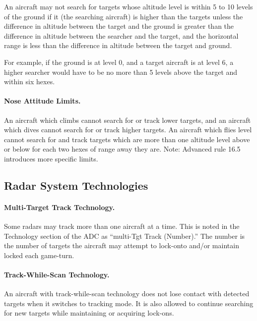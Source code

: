 {An aircraft may not search for targets whose altitude level is within 5 to 10 levels of the ground if it (the searching aircraft) is higher than the targets unless the difference in altitude between the target and the ground is greater than the difference in altitude between the searcher and the target, and the horizontal range is less than the difference in altitude between the target and ground.

For example, if the ground is at level 0, and a target aircraft is at level 6, a higher searcher would have to be no more than 5 levels above the target and within six hexes.


\paragraph{Nose Attitude Limits.} An aircraft which climbs cannot search for or track lower targets, and an aircraft which dives cannot search for or track higher targets. An aircraft which flies level cannot search for and track targets which are more than one altitude level above or below for each two hexes of range away they are. Note: Advanced rule 16.5 introduces more specific limits.

\begin{advancedrules}

\section{Radar System Technologies}

\paragraph{Multi-Target Track Technology.}\label{rule:multi-target-track-technology} Some radars may track more than one aircraft at a time. This is noted in the Technology section of the ADC as “multi-Tgt Track (Number).” The number is the number of targets the aircraft may attempt to lock-onto and/or maintain locked each game-turn.

\paragraph{Track-While-Scan Technology.} \label{rule:track-while-scan-technology} An aircraft with track-while-scan technology does not lose contact with detected targets when it switches to tracking mode. It is also allowed to continue searching for new targets while maintaining or acquiring lock-ons.


\end{advancedrules}}
